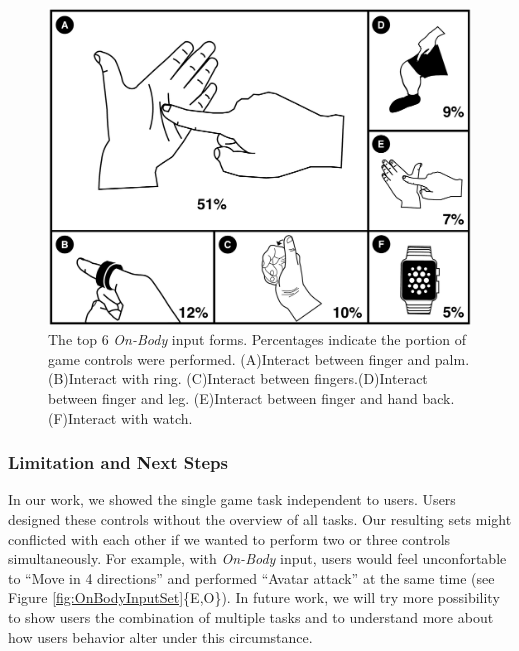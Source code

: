 \documentclass{sigchi}
\begin{document}
 \begin{figure}[!h]
  \centering
  \includegraphics[width=1\columnwidth]{OnBodyForms.pdf}
  \caption{The top 6 \emph{On-Body} input forms. Percentages indicate the portion of game controls were performed. (A)Interact between finger and palm. (B)Interact with ring. (C)Interact between fingers.(D)Interact between finger and leg. (E)Interact between finger and hand back. (F)Interact with watch.}
  \label{fig:figureOnBodyPorpotion}
  \end{figure}   

  \subsubsection{Limitation and Next Steps}

  In our work, we showed the single game task independent to users. Users designed these controls without the overview of all tasks. Our resulting sets might conflicted with each other if we wanted to perform two or three controls simultaneously. For example, with \emph{On-Body} input, users would feel unconfortable to ``Move in 4 directions'' and performed ``Avatar attack'' at the same time (see Figure \ref{fig:OnBodyInputSet}\{E,O\}). In future work, we will try more possibility to show users the combination of multiple tasks and to understand more about how users behavior alter under this circumstance.
\end{document}
